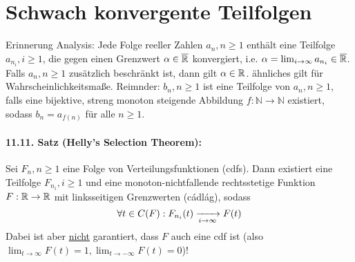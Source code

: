 \section*{Schwach konvergente Teilfolgen}
Erinnerung Analysis: Jede Folge reeller Zahlen $a_n,n\geq1$ enth\"alt eine Teilfolge $a_{n_i},i\geq1$, die gegen einen Grenzwert $\alpha\in\overline{\mathbb{R}}$ konvergiert, i.e. $\alpha=\lim_{i\to\infty}a_{n_i}\in\overline{\mathbb{R}}$. Falls $a_n,n\geq1$ zus\"atzlich beschr\"ankt ist, dann gilt $\alpha\in\mathbb{R}$. \"ahnliches gilt f\"ur Wahrscheinlichkeitsma\ss{}e. \newline
Reimnder: $b_n,n\geq1$ ist eine Teilfolge von $a_n,n\geq1$, falls eine bijektive, streng monoton steigende Abbildung $f:\mathbb{N}\to\mathbb{N}$ existiert, sodass $b_n=a_{f(n)}$ f\"ur alle $n\geq1$.

\paragraph{11.11. Satz (Helly's Selection Theorem):} Sei $F_n,n\geq1$ eine Folge von Verteilungsfunktionen (cdfs). Dann existiert eine Teilfolge $F_{n_i},i\geq1$ und eine monoton-nichtfallende rechtsstetige Funktion $F:\mathbb{R}\to\mathbb{R}$ mit linksseitigen Grenzwerten (cádlág), sodass 
$$\forall t\in C(F):F_{n_i}(t)\nto{}{i\to\infty}F(t)$$
Dabei ist aber \underline{nicht} garantiert, dass $F$ auch eine cdf ist (also $\displaystyle\lim_{t\to\infty}F(t)=1, \lim_{t\to-\infty}F(t)=0$)!


